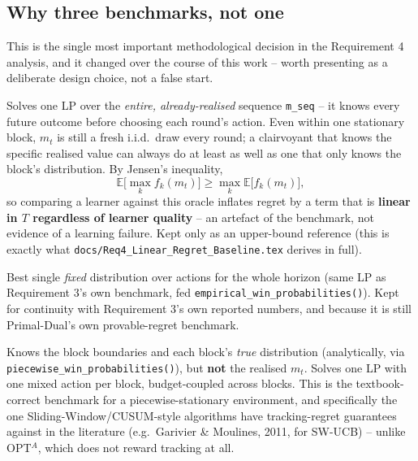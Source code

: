 \documentclass[11pt,a4paper]{article}
\newcommand{\E}{\mathbb{E}}
\newcommand{\1}{\mathbf{1}}
\begin{document}
\subsection{Why three benchmarks, not one}
\label{sec:benchmarks}

This is the single most important methodological decision in the Requirement 4 analysis, and it changed over the course of this work -- worth presenting as a deliberate design choice, not a false start.

\begin{description}[leftmargin=1.6em, style=nextline]
  \item[Dynamic / ``prophet'' clairvoyant (reference upper bound only).] Solves one LP over the \emph{entire, already-realised} sequence \texttt{m\_seq} -- it knows every future outcome before choosing each round's action. Even within one stationary block, $m_t$ is still a fresh i.i.d.\ draw every round; a clairvoyant that knows the specific realised value can always do at least as well as one that only knows the block's distribution. By Jensen's inequality,
  \[
    \E\big[\max_k f_k(m_t)\big] \ge \max_k \E\big[f_k(m_t)\big],
  \]
  so comparing a learner against this oracle inflates regret by a term that is \textbf{linear in $T$ regardless of learner quality} -- an artefact of the benchmark, not evidence of a learning failure. Kept only as an upper-bound reference (this is exactly what \texttt{docs/Req4\_Linear\_Regret\_Baseline.tex} derives in full).
  \item[OPT$^A$ (secondary).] Best single \emph{fixed} distribution over actions for the whole horizon (same LP as Requirement 3's own benchmark, fed \texttt{empirical\_win\_probabilities()}). Kept for continuity with Requirement 3's own reported numbers, and because it is still Primal-Dual's own provable-regret benchmark.
  \item[Piecewise expected clairvoyant (\textbf{primary}).] Knows the block boundaries and each block's \emph{true} distribution (analytically, via \texttt{piecewise\_win\_probabilities()}), but \textbf{not} the realised $m_t$. Solves one LP with one mixed action per block, budget-coupled across blocks. This is the textbook-correct benchmark for a piecewise-stationary environment, and specifically the one Sliding-Window/CUSUM-style algorithms have tracking-regret guarantees against in the literature (e.g.\ Garivier \& Moulines, 2011, for SW-UCB) -- unlike OPT$^A$, which does not reward tracking at all.
\end{description}
\end{document}
